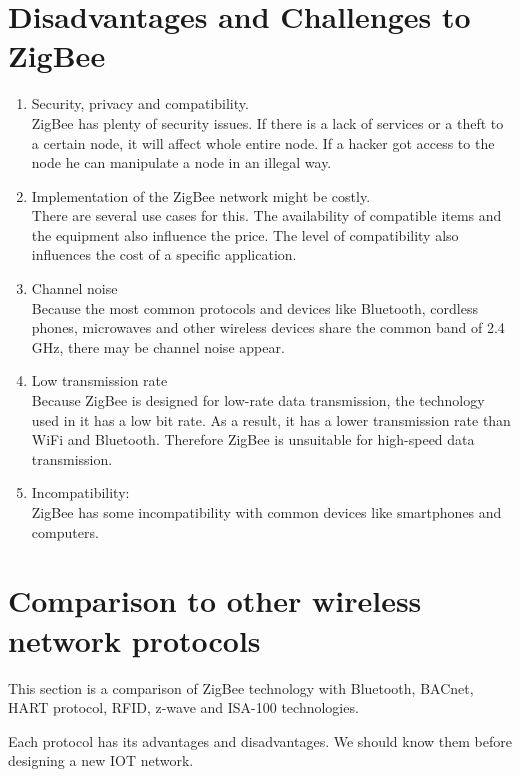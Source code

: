 \documentclass[conference]{IEEEtran}
\begin{document}
\section{Disadvantages and Challenges to ZigBee}
\begin{enumerate}
  \item Security, privacy and compatibility.\\
  ZigBee has plenty of security issues. If there is a lack of services or a theft to a certain node, it will affect whole entire node. If a hacker got access to the node he can manipulate a node in an illegal way.  \cite{Prasanna2022}
  \item Implementation of the ZigBee network might be costly.\\
  There are several use cases for this. The availability of compatible items and the equipment also influence the price. The level of compatibility also influences the cost of a specific application. \cite{Prasanna2022}
  \item Channel noise\\
  Because the most common protocols and devices like Bluetooth, cordless phones, microwaves and other wireless devices share the common band of 2.4 GHz, there may be channel noise appear.  \cite{Prasanna2022}
  \item  Low transmission rate\\
  Because ZigBee is designed for low-rate data transmission, the technology used in it has a low bit rate. As a result, it has a lower transmission rate than WiFi and Bluetooth. Therefore ZigBee is unsuitable for high-speed data transmission.\cite{Prasanna2022}
\item Incompatibility: \\
ZigBee has some incompatibility with common devices like smartphones and computers. \cite{Prasanna2022}
  
\end{enumerate}



\section{Comparison to other wireless network protocols}

This section is a comparison of ZigBee technology with Bluetooth, BACnet, HART protocol, RFID, z-wave and ISA-100 technologies. 

Each protocol has its advantages and disadvantages. We should know them before designing a new IOT network.
 
\end{document}
